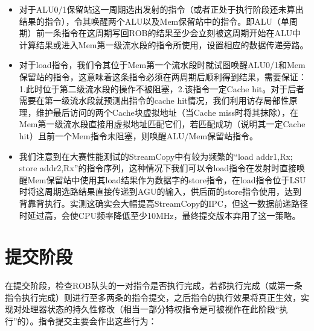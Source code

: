 \begin{itemize}
    \item 对于ALU0/1保留站这一周期选出发射的指令（或者正处于执行阶段还未算出结果的指令），令其唤醒两个ALU以及Mem保留站中的指令。即ALU（单周期）前一条指令在这周期写回ROB的结果至少会立刻被这周期开始在ALU中计算结果或进入Mem第一级流水段的指令所使用，设置相应的数据传递旁路。
    \item 对于load指令，我们令其位于Mem第一个流水段时就试图唤醒ALU0/1和Mem保留站的指令，这意味着这条指令必须在两周期后顺利得到结果，需要保证：1.此时位于第二级流水段的操作不被阻塞，2.该指令一定Cache hit。对于后者需要在第一级流水段就预测出指令的cache hit情况，我们利用访存局部性原理，维护最后访问的两个Cache块虚拟地址（当Cache miss时将其抹除），在Mem第一级流水段直接用虚拟地址匹配它们，若匹配成功（说明其一定Cache hit）且前一个Mem指令未阻塞，则唤醒ALU/Mem保留站指令。
    \item 我们注意到在大赛性能测试的StreamCopy中有较为频繁的“load addr1,Rx; store addr2,Rx”的指令序列，这种情况下我们可以令load指令在发射时直接唤醒Mem保留站中使用其load结果作为数据字的store指令，在load指令位于LSU时将这周期选路结果直接传递到AGU的输入，供后面的store指令使用，达到背靠背执行。实测这确实会大幅提高StreamCopy的IPC，但这一数据前递路径时延过高，会使CPU频率降低至少10MHz，最终提交版本弃用了这一策略。
\end{itemize}

\section{提交阶段}

在提交阶段，检查ROB队头的一对指令是否执行完成，若都执行完成（或第一条指令执行完成）则进行至多两条的指令提交，之后指令的执行效果将真正生效，实现对处理器状态的持久性修改（相当一部分特权指令是可被视作在此阶段“执行”的）。指令提交主要会作出这些行为：

